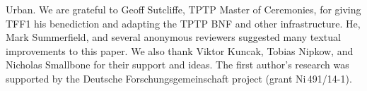 \pagebreak

\noindent
Urban.
We are grateful to Geoff Sutcliffe, TPTP Master of Ceremonies, for giving TFF1
his benediction and adapting the TPTP BNF and other infrastructure.
He, Mark Summerfield, and several anonymous reviewers suggested many textual
improvements to this paper.
We also thank Viktor Kuncak, Tobias Nipkow, and Nicholas Smallbone for their
support and ideas.
%
The first author's research was supported by the Deutsche
Forschungs\-gemein\-schaft project  (grant
Ni\,491\slash 14-1).
%
